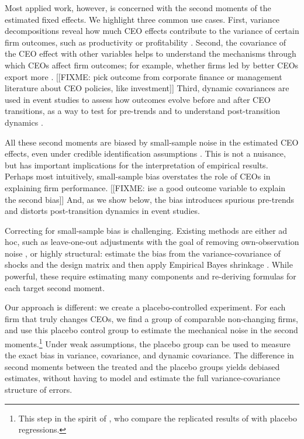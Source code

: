 \documentclass[11pt,a4paper]{article}
\begin{document}
Most applied work, however, is concerned with the second moments of the estimated fixed effects. We highlight three common use cases. First, variance decompositions reveal how much CEO effects contribute to the variance of certain firm outcomes, such as productivity or profitability \citep{}. Second, the covariance of the CEO effect with other variables helps to understand the mechanisms through which CEOs affect firm outcomes; for example, whether firms led by better CEOs export more \citep{}. [[FIXME: pick outcome from corporate finance or management literature about CEO policies, like investment]] Third, dynamic covariances are used in event studies to assess how outcomes evolve before and after CEO transitions, as a way to test for pre-trends and to understand post-transition dynamics \citep{}. 

All these second moments are biased by small-sample noise in the estimated CEO effects, even under credible identification assumptions \citep{andrews2008high,gaure2014correlation,Bonhomme2023-dx}. This is not a nuisance, but has important implications for the interpretation of empirical results. Perhaps most intuitively, small-sample bias overstates the role of CEOs in explaining firm performance. [[FIXME: ise a good outcome variable to explain the second bias]] And, as we show below, the bias introduces spurious pre-trends and distorts post-transition dynamics in event studies.

Correcting for small-sample bias is challenging. Existing methods are either ad hoc, such as leave-one-out adjustments with the goal of removing own-observation noise \citep{}, or highly structural: estimate the bias from the variance-covariance of shocks and the design matrix and then apply Empirical Bayes shrinkage \citep{andrews2008high,Bonhomme2023-dx,kline2024firm}. While powerful, these require estimating many components and re-deriving formulas for each target second moment.

Our approach is different: we create a placebo-controlled experiment. For each firm that truly changes CEOs, we find a group of comparable non-changing firms, and use this placebo control group to estimate the mechanical noise in the second moments.\footnote{This step in the spirit of \cite{jarosiewicz2023revisiting}, who compare the replicated results of  \cite{Bertrand2003-io} with placebo regressions.} Under weak assumptions, the placebo group can be used to measure the exact bias in variance, covariance, and dynamic covariance. The difference in second moments between the treated and the placebo groups yields debiased estimates, without having to model and estimate the full variance-covariance structure of errors.
\end{document}
